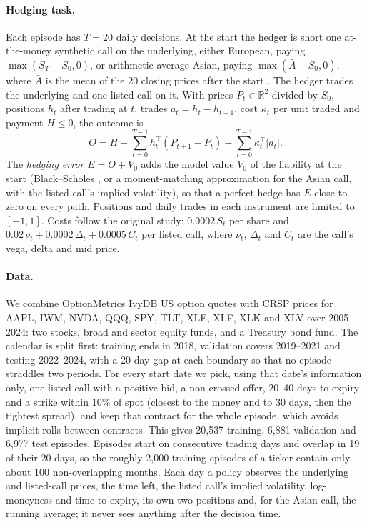 \documentclass[runningheads]{llncs}
\begin{document}
\paragraph{Hedging task.} Each episode has $T=20$ daily decisions. At the start the hedger is short one
at-the-money synthetic call on the underlying, either European, paying $\max(S_T-S_0,0)$, or
arithmetic-average Asian, paying $\max(\bar A-S_0,0)$, where $\bar A$ is the mean of the 20 closing prices
after the start \cite{kemna1990asian}. The hedger trades the underlying and one listed call on it. With
prices $P_t\in\mathbb R^2$ divided by $S_0$, positions $h_t$ after trading at $t$, trades
$a_t=h_t-h_{t-1}$, cost $\kappa_t$ per unit traded and payment $H\le 0$, the outcome is
\begin{equation}
O=H+\sum_{t=0}^{T-1}h_t^{\top}(P_{t+1}-P_t)-\sum_{t=0}^{T-1}\kappa_t^{\top}\lvert a_t\rvert .
\label{eq:outcome}
\end{equation}
The \emph{hedging error} $E=O+V_0$ adds the model value $V_0$ of the liability at the start
(Black--Scholes \cite{black1973pricing}, or a moment-matching approximation for the Asian call, with the
listed call's implied volatility), so that a perfect hedge has $E$ close to zero on every path. Positions and
daily trades in each instrument are limited to $[-1,1]$. Costs follow the original study: $0.0002\,S_t$ per
share and $0.02\,\nu_t+0.0002\,\Delta_t+0.0005\,C_t$ per listed call, where $\nu_t$, $\Delta_t$ and $C_t$
are the call's vega, delta and mid price.

\paragraph{Data.} We combine OptionMetrics IvyDB US option quotes with CRSP prices
\cite{wrdsOptionMetrics,crspStock} for AAPL, IWM, NVDA, QQQ, SPY, TLT, XLE, XLF, XLK and XLV over
2005--2024: two stocks, broad and sector equity funds, and a Treasury bond fund. The calendar is split first:
training ends in 2018, validation covers 2019--2021 and testing 2022--2024, with a 20-day gap at each
boundary so that no episode straddles two periods. For every start date we pick, using that date's
information only, one listed call with a positive bid, a non-crossed offer, 20--40 days to expiry and a
strike within 10\% of spot (closest to the money and to 30 days, then the tightest spread), and keep that
contract for the whole episode, which avoids implicit rolls between contracts. This gives 20,537 training,
6,881 validation and 6,977 test episodes. Episodes start on consecutive trading days and overlap in 19 of
their 20 days, so the roughly 2,000 training episodes of a ticker contain only about 100 non-overlapping
months. Each day a policy observes the underlying and listed-call prices, the time left, the listed call's
implied volatility, log-moneyness and time to expiry, its own two positions and, for the Asian call, the
running average; it never sees anything after the decision time.
\end{document}
